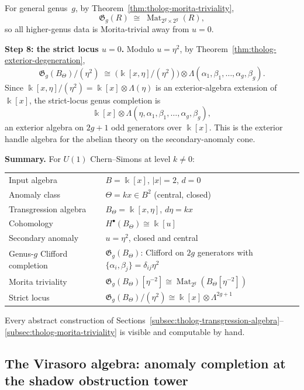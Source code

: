 \begin{example}
For general genus~$g$, by
Theorem~\ref{thm:tholog-morita-triviality},
\[
\mathfrak{G}_g(R)
\;\cong\;
\operatorname{Mat}_{2^g\times 2^g}(R),
\]
so all higher-genus data is Morita-trivial away from $u=0$.

\medskip
\noindent\textbf{Step 8: the strict locus $u=0$.}
Modulo $u=\eta^2$, by Theorem~\ref{thm:tholog-exterior-degeneration},
\[
\mathfrak{G}_g(B_\Theta)/(\eta^2)
\;\cong\;
\bigl(\Bbbk[x,\eta]/(\eta^2)\bigr)
\otimes
\Lambda(\alpha_1,\beta_1,\dots,\alpha_g,\beta_g).
\]
Since $\Bbbk[x,\eta]/(\eta^2)=\Bbbk[x]\otimes\Lambda(\eta)$
is an exterior-algebra extension of $\Bbbk[x]$, the strict-locus
genus completion is
\[
\Bbbk[x]\otimes\Lambda(\eta,\alpha_1,\beta_1,\dots,\alpha_g,\beta_g),
\]
an exterior algebra on $2g+1$ odd generators over $\Bbbk[x]$.
This is the exterior handle algebra for the abelian
theory on the secondary-anomaly cone.

\medskip
\noindent\textbf{Summary.}
For $U(1)$ Chern--Simons at level $k\neq 0$:
\begin{center}
\renewcommand{\arraystretch}{1.2}
\begin{tabular}{ll}
Input algebra & $B=\Bbbk[x]$, $|x|=2$, $d=0$ \\
Anomaly class & $\Theta=kx\in B^2$ (central, closed) \\
Transgression algebra &
 $B_\Theta=\Bbbk[x,\eta]$, $d\eta=kx$ \\
Cohomology &
 $H^\bullet(B_\Theta)\cong\Bbbk[u]$ \\
Secondary anomaly & $u=\eta^2$, closed and central \\
Genus-$g$ Clifford completion &
 $\mathfrak{G}_g(B_\Theta)$: Clifford on $2g$ generators
 with $\{\alpha_i,\beta_j\}=\delta_{ij}\eta^2$ \\
Morita triviality &
 $\mathfrak{G}_g(B_\Theta)[\eta^{-2}]
 \cong\operatorname{Mat}_{2^g}(B_\Theta[\eta^{-2}])$ \\
Strict locus &
 $\mathfrak{G}_g(B_\Theta)/(\eta^2)
 \cong\Bbbk[x]\otimes\Lambda^{2g+1}$
\end{tabular}
\end{center}
Every abstract construction of
Sections~\ref{subsec:tholog-transgression-algebra}--\ref{subsec:tholog-morita-triviality}
is visible and computable by hand.
\end{example}

\subsection{The Virasoro algebra: anomaly completion
at the shadow obstruction tower}
\label{subsec:tholog-virasoro}

